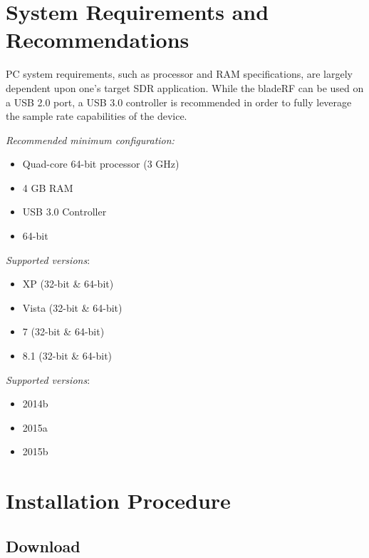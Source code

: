 \vspace{0.25in}

\section{System Requirements and Recommendations}

PC system requirements, such as processor and RAM specifications, are
largely dependent upon one's target SDR application. While the bladeRF
can be used on a USB 2.0 port, a USB 3.0 controller is recommended in
order to fully leverage the sample rate capabilities of the device.

\vspace{0.125in}

\textit{Recommended minimum configuration:}
\begin{itemize}
  \item Quad-core 64-bit processor (3 GHz)
  \item 4 GB RAM
  \item USB 3.0 Controller
  \item {} 64-bit
\end{itemize}

\vspace{0.125in}

\textit{Supported \windows versions}:
\begin{itemize}
  \item XP (32-bit \& 64-bit)
  \item Vista (32-bit \& 64-bit)
  \item 7 (32-bit \& 64-bit)
  \item 8.1 (32-bit \& 64-bit)
\end{itemize}

\vspace{0.125in}

\textit{Supported \matlab versions}:
\begin{itemize}
  \item 2014b
  \item 2015a
  \item 2015b
\end{itemize}

\newpage

\section{Installation Procedure}

\subsection{Download}

